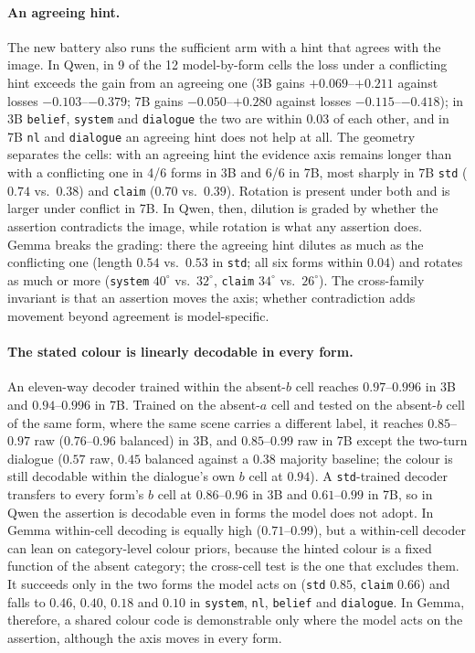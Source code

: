 \documentclass[10pt]{article}
\begin{document}
\paragraph{An agreeing hint.}
The new battery also runs the sufficient arm with a hint that agrees with the
image. In Qwen, in 9 of the 12 model-by-form cells the loss under a conflicting hint
exceeds the gain from an agreeing one (3B gains $+0.069$--$+0.211$ against
losses $-0.103$--$-0.379$; 7B gains $-0.050$--$+0.280$ against losses
$-0.115$--$-0.418$); in 3B \texttt{belief}, \texttt{system} and \texttt{dialogue}
the two are within $0.03$ of each other, and in 7B \texttt{nl} and
\texttt{dialogue} an agreeing hint does not help at all. The geometry separates
the cells: with an agreeing hint the evidence axis remains longer than with a
conflicting one in 4/6 forms in 3B and 6/6 in 7B, most sharply in 7B
\texttt{std} ($0.74$ vs.\ $0.38$) and \texttt{claim} ($0.70$ vs.\ $0.39$).
Rotation is present under both and is larger under conflict in 7B. In Qwen,
then, dilution is graded by whether the assertion contradicts the image,
while rotation is what any assertion does. Gemma breaks the grading: there
the agreeing hint dilutes as much as the conflicting one (length $0.54$ vs.\
$0.53$ in \texttt{std}; all six forms within $0.04$) and rotates as much or
more (\texttt{system} $40^\circ$ vs.\ $32^\circ$, \texttt{claim}
$34^\circ$ vs.\ $26^\circ$). The cross-family invariant is that an assertion
moves the axis; whether contradiction adds movement beyond agreement is
model-specific.

\paragraph{The stated colour is linearly decodable in every form.}
An eleven-way decoder trained within the absent-$b$ cell reaches
$0.97$--$0.996$ in 3B and $0.94$--$0.996$ in 7B. Trained on the absent-$a$
cell and tested on the absent-$b$ cell of the same form, where the same scene
carries a different label, it reaches $0.85$--$0.97$ raw ($0.76$--$0.96$
balanced) in 3B, and $0.85$--$0.99$ raw in 7B except the two-turn dialogue
($0.57$ raw, $0.45$ balanced against a $0.38$ majority baseline; the colour is
still decodable within the dialogue's own $b$ cell at $0.94$). A
\texttt{std}-trained decoder transfers to every form's $b$ cell at
$0.86$--$0.96$ in 3B and $0.61$--$0.99$ in 7B, so in Qwen the assertion is
decodable even in forms the model does not adopt. In Gemma within-cell
decoding is equally high ($0.71$--$0.99$), but a within-cell decoder can lean
on category-level colour priors, because the hinted colour is a fixed
function of the absent category; the cross-cell test is the one that excludes
them. It succeeds only in the two forms the model acts on (\texttt{std}
$0.85$, \texttt{claim} $0.66$) and falls to $0.46$, $0.40$, $0.18$ and
$0.10$ in \texttt{system}, \texttt{nl}, \texttt{belief} and
\texttt{dialogue}. In Gemma, therefore, a shared colour code is demonstrable
only where the model acts on the assertion, although the axis moves in every
form.
\end{document}
